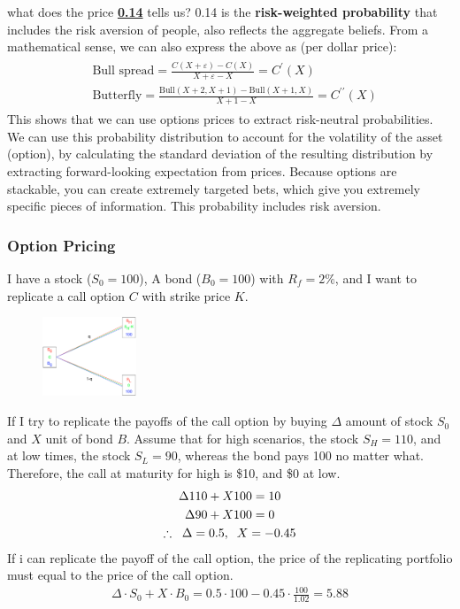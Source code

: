 \begin{multicols}{2}
what does the price \underline{\textbf{0.14}} tells us? 0.14 is the \textbf{risk-weighted probability} that includes the risk aversion of people, also reflects the aggregate beliefs. From a mathematical sense, we can also express the above as (per dollar price):
\begin{gather*}
    \begin{split}
        &\text{Bull spread} = \frac{C(X+\varepsilon)-C(X)}{X+\varepsilon-X} = \boxed{C^\prime(X)}\\[0.2cm]
        &\text{Butterfly} = \frac{\text{Bull}(X+2,X+1)-\text{Bull}(X+1,X)}{X+1-X}=\boxed{C^{\prime\prime}(X)}
    \end{split}
\end{gather*}
This shows that we can use options prices to extract risk-neutral probabilities. We can use this probability distribution to account for the volatility of the asset (option), by calculating the standard deviation of the resulting distribution by extracting forward-looking expectation from prices. Because options are stackable, you can create extremely targeted bets, which give you extremely specific pieces of information. This probability includes risk aversion. 

\subsubsection{Option Pricing}
I have a stock ($S_0=100$), A bond ($B_0=100$) with $R_f=2\%$, and I want to replicate a call option $C$ with strike price $K$. 
\begin{figure}[H]
    \centering 
    \includegraphics[width =0.25\textwidth]{Figure/tree.png}
\end{figure}
If I try to replicate the payoffs of the call option by buying $\Delta$ amount of stock $S_0$ and $X$ unit of bond $B$. Assume that for high scenarios, the stock $S_H = 110$, and at low times, the stock $S_L = 90$, whereas the bond pays 100 no matter what. Therefore, the call at maturity for high is \$10, and \$0 at low. 
\begin{gather*}
    \Delta110+X100=10\\
    \Delta90+X100=0\\
    \therefore\hspace*{0.2cm}\Delta = 0.5,\hspace*{0.2cm}X=-0.45
\end{gather*}
If i can replicate the payoff of the call option, the price of the replicating portfolio must equal to the price of the call option.
\begin{gather*}
    \Delta\cdot S_0 + X\cdot B_0 = 0.5\cdot100-0.45\cdot\frac{100}{1.02} = 5.88
\end{gather*}


\end{multicols}
